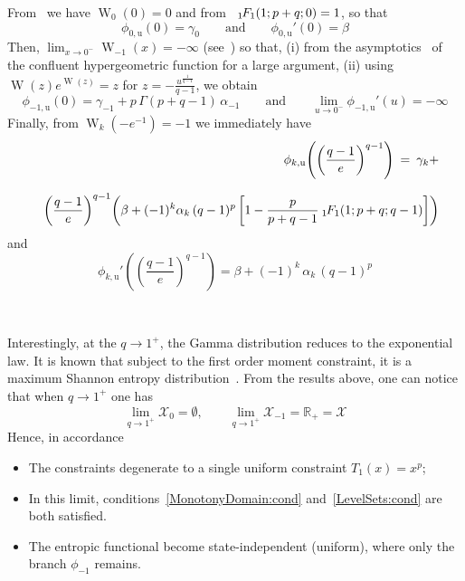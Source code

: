 \documentclass[entropy,article,submit,moreauthors,pdftex]{Definitions/mdpi}
\def\Rset{\mathbb{R}}%
\def\X{\mathcal{X}}%
\def\W{\operatorname{W}} %
\newcommand{\hypgeom}[2]{\mbox{}_{#1}\hspace{-1pt}F_{#2}}%
\def\u{\mathrm{u}}
\begin{document}
From~\cite[Eq.~3.1]{CorGon96}    we   have    $\W_0(0)   =    0$   and
from~\cite[Eq.~13.1.2]{AbrSte70} $\hypgeom{1}{1}(1 ; p+q ; 0) = 1$, so that
%
\[
\phi_{0,\u}(0) = \gamma_0 \qquad \mbox{and} \qquad \phi_{0,\u}'(0) = \beta
\]
%
Then, $\displaystyle \lim_{x  \to 0^-} \W_{-1}(x) =  - \infty$ (see~\cite[Fig.~1
  or       Eq.~4.18]{CorGon96})      so       that,      (i)       from      the
asymptotics~\cite[Eq.~13.1.4]{AbrSte70} of the confluent hypergeometric function
for  a  large  argument,   (ii)  using  $\W(z)  e^{\W(z)}  =  z$   for  $z  =  -
\frac{u^{\frac{1}{q-1}}}{q-1}$, we obtain
%
\[
\phi_{-1,\u}(0)  =  \gamma_{-1}  +  p \,  \Gamma(p+q-1)  \,  \alpha_{-1}  \qquad
\mbox{and} \qquad \lim_{u \to 0^-} \phi_{-1,\u}'(u) = -\infty
\]
%
Finally, from $\W_k(-e^{-1}) = -1$ we immediately have
%
\begin{eqnarray*}
  && \phi_{k,\u}\left( \left( \frac{q-1}{e} \right)^{q-1} \right) \: = \:
  \gamma_k +
  \\[2.5mm]
  && \left( \frac{q-1}{e} \right)^{q-1} \left( \beta + (-1)^k \alpha_k \,
  (q-1)^p \, \left[ 1 - \frac{p}{p+q-1} \: \hypgeom{1}{1}\left( 1 ; p+q ; q-1
    \right) \right] \right)
\end{eqnarray*}
%
and
%
\[
\phi_{k,\u}'\left( \left(  \frac{q-1}{e} \right)^{q-1} \right) =  \beta + (-1)^k
\, \alpha_k \, (q-1)^p
\]

\

Interestingly,  at the  $q  \to  1^+$, the  Gamma  distribution  reduces to  the
exponential law. It is known that  subject to the first order moment constraint,
it is a  maximum Shannon entropy distribution~\cite{CovTho06}.  From the results
above, one can notice that when $q \to 1^+$ one has
%
\[
\lim_{q \to 1^+} \X_0  = \emptyset, \qquad \lim_{q \to 1^+}  \X_{-1} = \Rset_+ =
\X
\]
%
Hence, in accordance
\begin{itemize}
\item The constraints degenerate to a single uniform constraint $T_1(x) = x^p$;
%
\item In this limit, conditions~\ref{MonotonyDomain:cond} and~\ref{LevelSets:cond}
    are both satisfied.
%
\item The entropic functional become state-independent (uniform), where only the
  branch $\phi_{-1}$ remains.  
%
\end{itemize}
\end{document}
